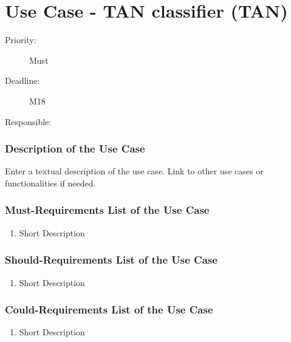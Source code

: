 \newpage
\section{Use Case - TAN classifier (TAN)}
\label{UseCase:TAN}

\begin{description}
\item[Priority:] Must
\item[Deadline:] M18
\item[Responsible:]
\end{description}

\subsubsection*{Description of the Use Case}

Enter a textual description of the use case. Link to other use cases or functionalities if needed. 


\subsubsection*{Must-Requirements List of the Use Case}

\begin{enumerate}
\item Short Description
\end{enumerate}

\subsubsection*{Should-Requirements List of the Use Case}

\begin{enumerate}
\item Short Description
\end{enumerate}

\subsubsection*{Could-Requirements List of the Use Case}

\begin{enumerate}
\item Short Description
\end{enumerate}


